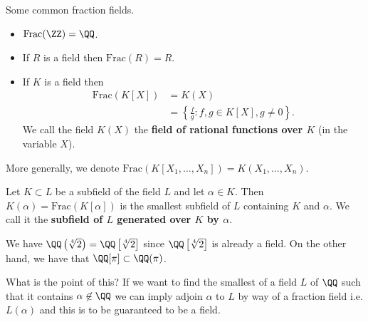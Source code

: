 \documentclass[12pt, a4paper]{article}
\begin{document}
\begin{mdprop}
    Some common fraction fields.
    \begin{itemize}
        \item \(\text{Frac}(\ZZ)=\QQ\).
        \item If \(R\) is a field then \(\text{Frac}(R)=R\).
        \item If \(K\) is a field then 
        \[\begin{aligned}
            \text{Frac}(K[X])&=K(X) \\
            &=\left\{ \frac{f}{g} :f,g\in K[X], g\neq 0 \right\}.
        \end{aligned}\]
        We call the field \(K(X)\) the \textbf{field of rational functions over \(K\)} (in the variable \(X\)).
    \end{itemize}
\end{mdprop}

\begin{mdremark}
    More generally, we denote \(\text{Frac}\left( K[X_1,\ldots,X_n] \right) = K(X_1,\ldots,X_n)\).
\end{mdremark}

\begin{definition}
    Let \(K \subset L\) be a subfield of the field \(L\) and let \(\alpha \in K\). Then \(K(\alpha)=\text{Frac}(K[\alpha])\) is the smallest subfield of \(L\) containing \(K\) and \(\alpha\). We call it the \textbf{subfield of \(L\) generated over \(K\) by \(\alpha\)}. 
\end{definition}

\begin{example}
    We have \(\QQ\left( \sqrt[4]{2} \right) = \QQ\left[ \sqrt[4]{2} \right]\) since \(\QQ\left[ \sqrt[4]{2} \right]\) is already a field. On the other hand, we have that \(\QQ[\pi] \subset \QQ(\pi)\).
\end{example}

\begin{mdnote}
    What is the point of this? If we want to find the smallest of a field \(L\) of \(\QQ\) such that it contains \(\alpha \not\in \QQ\) we can imply adjoin \(\alpha\) to \(L\) by way of a fraction field i.e. \(L(\alpha)\) and this is to be guaranteed to be a field.
\end{mdnote}
\end{document}
